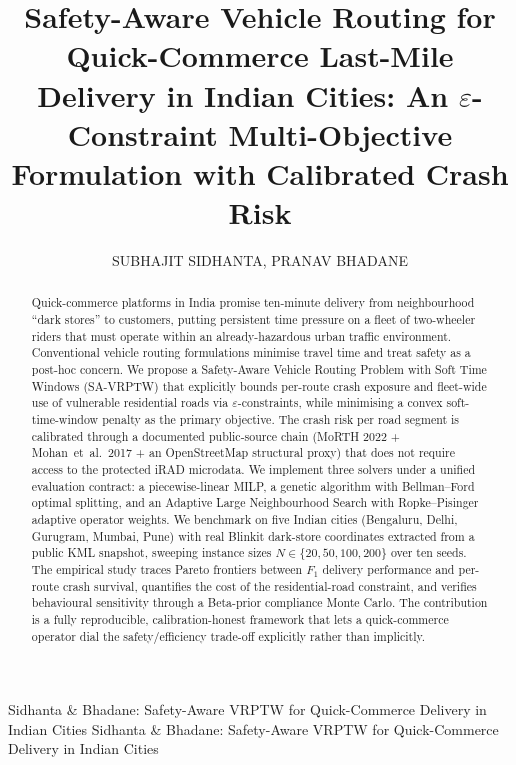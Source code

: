 \documentclass{ieeeaccess}
\begin{document}

\title{Safety-Aware Vehicle Routing for Quick-Commerce Last-Mile
Delivery in Indian Cities: An $\varepsilon$-Constraint Multi-Objective
Formulation with Calibrated Crash Risk}

\author{\uppercase{Subhajit Sidhanta},
\uppercase{Pranav Bhadane}}

\address[1]{Department of Industrial and Systems Engineering,
Indian Institute of Technology Kharagpur, Kharagpur, West Bengal 721302, India
(e-mail: subhajit@iem.iitkgp.ac.in;
pranavbhadane@kgpian.iitkgp.ac.in)}


\markboth
{Sidhanta \& Bhadane: Safety-Aware VRPTW for Quick-Commerce Delivery in Indian Cities}
{Sidhanta \& Bhadane: Safety-Aware VRPTW for Quick-Commerce Delivery in Indian Cities}


\begin{abstract}
Quick-commerce platforms in India promise ten-minute delivery from
neighbourhood ``dark stores'' to customers, putting persistent time
pressure on a fleet of two-wheeler riders that must operate within an
already-hazardous urban traffic environment. Conventional vehicle
routing formulations minimise travel time and treat safety as a
post-hoc concern. We propose a Safety-Aware Vehicle Routing Problem
with Soft Time Windows (SA-VRPTW) that explicitly bounds per-route
crash exposure and fleet-wide use of vulnerable residential roads via
$\varepsilon$-constraints, while minimising a convex soft-time-window
penalty as the primary objective. The crash risk per road segment is
calibrated through a documented public-source chain
(MoRTH 2022 + Mohan~et~al.~2017 + an OpenStreetMap structural proxy)
that does not require access to the protected iRAD microdata. We
implement three solvers under a unified evaluation contract: a
piecewise-linear MILP, a genetic algorithm with Bellman--Ford optimal
splitting, and an Adaptive Large Neighbourhood Search with
Ropke--Pisinger adaptive operator weights. We benchmark on five Indian
cities (Bengaluru, Delhi, Gurugram, Mumbai, Pune) with real Blinkit
dark-store coordinates extracted from a public KML snapshot, sweeping
instance sizes $N \in \{20, 50, 100, 200\}$ over ten seeds. The
empirical study traces Pareto frontiers between $F_1$ delivery
performance and per-route crash survival, quantifies the cost of the
residential-road constraint, and verifies behavioural sensitivity
through a Beta-prior compliance Monte Carlo. The contribution is a
fully reproducible, calibration-honest framework that lets a
quick-commerce operator dial the safety/efficiency trade-off
explicitly rather than implicitly.
\end{abstract}
\end{document}
